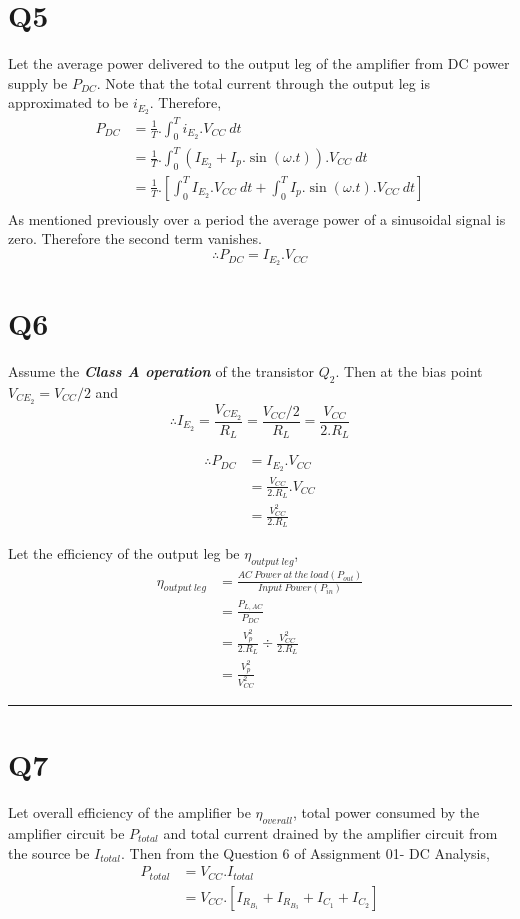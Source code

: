 \documentclass[a4paper,11pt]{article}%
\begin{document}
\section*{Q5}
Let the average power delivered to the output leg of the amplifier from DC power supply be $P_{DC}$. Note that the total current through the output leg is approximated to be $i_{E_2}$. Therefore,
\[
\begin{split}
	P_{DC} &= \frac{1}{T} .\int_0^T i_{E_2}.V_{CC}~dt\\
	& = \frac{1}{T} .\int_0^T (I_{E_2} + I_p.\sin(\omega.t)).V_{CC}~dt\\
& = \frac{1}{T} .\left[ \int_0^T I_{E_2}.V_{CC}~dt + \int_0^T I_p.\sin(\omega.t).V_{CC}~dt \right] \\	
\end{split}
\]
As mentioned previously over a period the average power of a sinusoidal signal is zero. Therefore the second term vanishes.
\[\therefore P_{DC} = I_{E_2}.V_{CC} \]



\section*{Q6}

Assume the \textbf{\textit{Class A operation}} of the transistor $Q_2$. Then at the bias point $V_{CE_2} = V_{CC}/2$ and 
\[\therefore I_{E_2} = \frac{V_{CE_2}}{R_L} = \frac{ V_{CC}/2}{R_L} = \frac{V_{CC}}{2.R_L}\]

\[
\begin{split}
\therefore	P_{DC} &= I_{E_2}.V_{CC}\\
	& = \frac{V_{CC}}{2.R_L}.V_{CC}\\
	&= \frac{V_{CC}^2}{2.R_L}
\end{split}
\]

Let the efficiency of the output leg be $\eta_{output~leg}$,
\[
\begin{split}
\eta_{output~leg} &= \frac{AC~Power~at~the~load(P_{out})}{Input~Power(P_{in})}\\ &= \frac{P_{L,AC}}{P_{DC}}\\
&= \frac{V_p^2}{2.R_L} \div \frac{V_{CC}^2}{2.R_L}\\
& = \frac{V_p^2}{V_{CC}^2}
\end{split}
\]
\hrule
\section*{Q7}

Let overall efficiency of the amplifier be $\eta_{overall}$,
total power consumed by the amplifier circuit be $P_{total}$ and total current drained by the amplifier circuit from the source be $I_{total}$. Then from the Question 6 of Assignment 01- DC Analysis,
\[
\begin{split}
	P_{total} &= V_{CC}.I_{total}\\
	&= V_{CC}. \left[  I_{R_{B_1}}+  I_{R_{B_3}}+ I_{C_1}+ I_{C_2}\right]
\end{split}
\]
\end{document}
